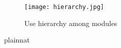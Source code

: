 \documentclass[12pt, titlepage]{article}
\begin{document}

\begin{figure}[H]
\centering
\texttt{[image: hierarchy.jpg]}
\caption{Use hierarchy among modules}
\label{FigUH}
\end{figure}


 {plainnat}


\newpage{}
\end{document}
